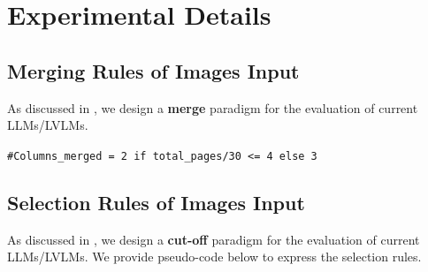 \section{Experimental Details}
\label{xsec:experimental_details}


\subsection{Merging Rules of Images Input}
\label{xsubsec:rules_of_images_merging}
As discussed in , we design a \textbf{merge} paradigm for the evaluation of current LLMs/LVLMs.

\noindent\texttt{\#Columns\_merged = 2 if total\_pages/30 <= 4 else 3}

\begin{table}[htbp]
    \centering
    \caption{Merging rules in the ablation experiment of input paradigms. \textbf{\#Columns\_merged}: the number of columns in the sub-image array in the merged image; \textbf{\#Images\_merged}: the number of new images after merged.}
    \label{tab:merging_rules}
    \vspace{-5mm}
\end{table}


\subsection{Selection Rules of Images Input}
\label{xsubsec:rules_of_images_selection}
As discussed in , we design a \textbf{cut-off} paradigm for the evaluation of current LLMs/LVLMs. We provide pseudo-code below to express the selection rules.

